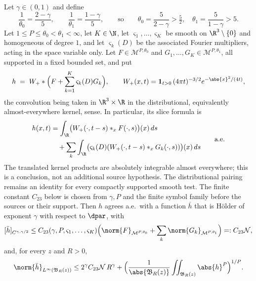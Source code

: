\documentclass[11pt,reqno]{amsart}
\begin{document}
\begin{proposition}
\label{prop:heat-morrey-hoelder}
Let $\gamma\in(0,1)$ and define
\begin{equation}\label{eq:q0q1}
  \frac1{\theta_{0}}=\frac{2-\gamma}{5},\qquad
  \frac1{\theta_{1}}=\frac{1-\gamma}{5},
  \qquad\text{so}\qquad \theta_{0}=\frac{5}{2-\gamma}>\tfrac52,
  \quad\theta_{1}=\frac{5}{1-\gamma}>5 .
\end{equation}
Let $1\le P\le\theta_{0}<\theta_{1}<\infty$, let $K\in\N$, let
$\varsigma_{1},\dots,\varsigma_{K}$ be smooth on $\R^{3}\setminus\{0\}$ and
homogeneous of degree $1$, and let $\varsigma_{k}(D)$ be the associated Fourier
multipliers, acting in the space variable only. Let
$F\in\mathcal{M}^{P,\theta_{0}}$ and $G_{1},\dots,G_{K}\in\mathcal{M}^{P,\theta_{1}}$,
all supported in a fixed bounded set, and put
\begin{equation}\label{eq:heat-potential}
  h \;=\; W_{+}*\Bigl(F+\sum_{k=1}^{K}\varsigma_{k}(D)G_{k}\Bigr),
  \qquad W_{+}(x,t)=\mathbf{1}_{t>0}\,(4\pi t)^{-3/2}e^{-\abs{x}^{2}/(4t)} ,
\end{equation}
the convolution being taken in $\R^{3}\times\R$ in the distributional,
equivalently almost-everywhere kernel, sense. In particular, its slice
formula is
\[
 \begin{aligned}
 h(x,t)&=\int_{\R}\bigl(W_+(\cdot,t-s)*_x F(\cdot,s)\bigr)(x)\,ds\\
 &\quad+\sum_k\int_{\R}
   \bigl(\varsigma_k(D)(W_+(\cdot,t-s)*_xG_k(\cdot,s))\bigr)(x)\,ds
 \end{aligned}
 \qquad\text{a.e.}
\]
The translated kernel products are absolutely integrable almost everywhere;
this is a conclusion, not an additional source hypothesis. The
distributional pairing remains an identity for every compactly supported
smooth test. The finite constant $C_{23}$ below is chosen from
$\gamma,P$ and the finite symbol family before the sources or their support.
Then $h$ agrees a.e.\ with a
function $\bar h$ that is H\"older of exponent $\gamma$ with respect to
$\dpar$, with
\begin{equation}\label{eq:heat-hoelder}
  [\bar h]_{C^{\gamma,\gamma/2}}\le C_{23}(\gamma,P,\varsigma_{1},\dots,\varsigma_{K})
     \Bigl(\norm{F}_{\mathcal{M}^{P,\theta_{0}}}
          +\sum_{k}\norm{G_{k}}_{\mathcal{M}^{P,\theta_{1}}}\Bigr)=:C_{23}\mathcal{N},
\end{equation}
and, for every $z$ and $R>0$,
\begin{equation}\label{eq:heat-Linfty}
  \norm{\bar h}_{L^{\infty}(\mathfrak{B}_{R}(z))}
  \le 2^{\gamma}C_{23}\mathcal{N}\,R^{\gamma}
   +\Bigl(\frac1{\abs{\mathfrak{B}_{R}(z)}}\iint_{\mathfrak{B}_{R}(z)}
      \abs{h}^{P}\Bigr)^{1/P}.
\end{equation}
\end{proposition}
\end{document}
